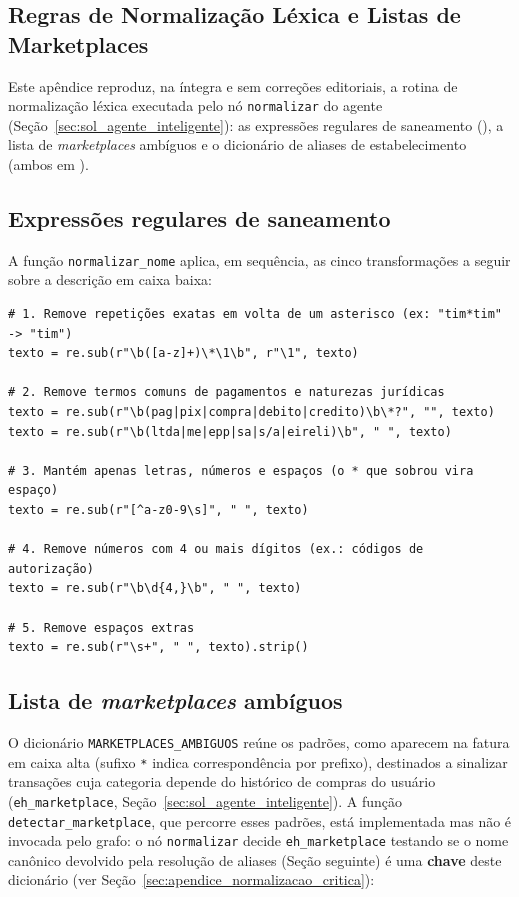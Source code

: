 \begin{apendicesenv}
\chapter{Regras de Normalização Léxica e Listas de Marketplaces}
\label{apendice:normalizacao}

Este apêndice reproduz, na íntegra e sem correções editoriais, a rotina de normalização léxica executada pelo nó \texttt{normalizar} do agente (Seção~\ref{sec:sol_agente_inteligente}): as expressões regulares de saneamento (), a lista de \textit{marketplaces} ambíguos e o dicionário de aliases de estabelecimento (ambos em ).

\section{Expressões regulares de saneamento}

A função \texttt{normalizar\_nome} aplica, em sequência, as cinco transformações a seguir sobre a descrição em caixa baixa:

{\footnotesize
\begin{verbatim}
# 1. Remove repetições exatas em volta de um asterisco (ex: "tim*tim" -> "tim")
texto = re.sub(r"\b([a-z]+)\*\1\b", r"\1", texto)

# 2. Remove termos comuns de pagamentos e naturezas jurídicas
texto = re.sub(r"\b(pag|pix|compra|debito|credito)\b\*?", "", texto)
texto = re.sub(r"\b(ltda|me|epp|sa|s/a|eireli)\b", " ", texto)

# 3. Mantém apenas letras, números e espaços (o * que sobrou vira espaço)
texto = re.sub(r"[^a-z0-9\s]", " ", texto)

# 4. Remove números com 4 ou mais dígitos (ex.: códigos de autorização)
texto = re.sub(r"\b\d{4,}\b", " ", texto)

# 5. Remove espaços extras
texto = re.sub(r"\s+", " ", texto).strip()
\end{verbatim}
}

\section{Lista de \textit{marketplaces} ambíguos}
\label{sec:apendice_marketplaces}

O dicionário \texttt{MARKETPLACES\_AMBIGUOS} reúne os padrões, como aparecem na fatura em caixa alta (sufixo \texttt{*} indica correspondência por prefixo), destinados a sinalizar transações cuja categoria depende do histórico de compras do usuário (\texttt{eh\_marketplace}, Seção~\ref{sec:sol_agente_inteligente}). A função \texttt{detectar\_marketplace}, que percorre esses padrões, está implementada mas não é invocada pelo grafo: o nó \texttt{normalizar} decide \texttt{eh\_marketplace} testando se o nome canônico devolvido pela resolução de aliases (Seção seguinte) é uma \textbf{chave} deste dicionário (ver Seção~\ref{sec:apendice_normalizacao_critica}):


\end{apendicesenv}
